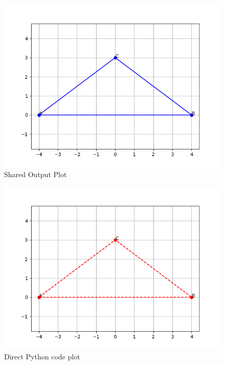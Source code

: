 \documentclass[journal]{IEEEtran}
\begin{document}
\begin{figure}[H]
    \centering
    \includegraphics[width=0.8\columnwidth]{figs/Figure_1.png}
    \caption{Shared Output Plot}
    \label{fig:fig1}
\end{figure}

\begin{figure}[H]
    \centering
    \includegraphics[width=0.8\columnwidth]{figs/Figure_2.png}
    \caption{Direct Python code plot}
    \label{fig:fig2}
\end{figure}
\end{document}
